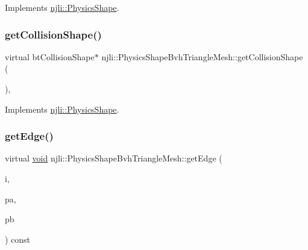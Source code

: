 Implements \mbox{\hyperlink{classnjli_1_1_physics_shape_a527e956caca24bf16ed0d47f69ff14e8}{njli\+::\+Physics\+Shape}}.

\mbox{\label{classnjli_1_1_physics_shape_bvh_triangle_mesh_ac4db6814bd13306aee765a71203525a4}} 
\subsubsection{\texorpdfstring{get\+Collision\+Shape()}{getCollisionShape()}\hspace{0.1cm}{\footnotesize\ttfamily [2/2]}}
{\footnotesize\ttfamily virtual bt\+Collision\+Shape$\ast$ njli\+::\+Physics\+Shape\+Bvh\+Triangle\+Mesh\+::get\+Collision\+Shape (\begin{DoxyParamCaption}{ }\end{DoxyParamCaption})\hspace{0.3cm}{\ttfamily [protected]}, {\ttfamily [virtual]}}



Implements \mbox{\hyperlink{classnjli_1_1_physics_shape_a2910f0362035c971f245349a55378b01}{njli\+::\+Physics\+Shape}}.

\mbox{\label{classnjli_1_1_physics_shape_bvh_triangle_mesh_a5595ac8002b807fefc1eed4b0dbc3762}} 
\subsubsection{\texorpdfstring{get\+Edge()}{getEdge()}}
{\footnotesize\ttfamily virtual \mbox{\hyperlink{_thread_8h_af1e856da2e658414cb2456cb6f7ebc66}{void}} njli\+::\+Physics\+Shape\+Bvh\+Triangle\+Mesh\+::get\+Edge (\begin{DoxyParamCaption}\item[{int}]{i,  }\item[{bt\+Vector3 \&}]{pa,  }\item[{bt\+Vector3 \&}]{pb }\end{DoxyParamCaption}) const\hspace{0.3cm}{\ttfamily [virtual]}}

